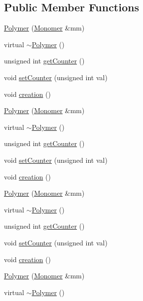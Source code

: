 \subsection*{Public Member Functions}
\begin{DoxyCompactItemize}
\item 
\hyperlink{class_polymer_ae77454a3908652e4df6a26b9cac509a5}{Polymer} (\hyperlink{class_monomer}{Monomer} \&mm)
\item 
virtual \hyperlink{class_polymer_aac2b3983f375a5691c7d5ca1a79594d5}{$\sim$\+Polymer} ()
\item 
unsigned int \hyperlink{class_polymer_a8346d821e5f8690d7816ba1d40036b69}{get\+Counter} ()
\item 
void \hyperlink{class_polymer_a7ed6bbe09a570b59f9253d63fd3326d2}{set\+Counter} (unsigned int val)
\item 
void \hyperlink{class_polymer_a1daba3eb2ba8428bf2f3e814668b155f}{creation} ()
\item 
\hyperlink{class_polymer_ae77454a3908652e4df6a26b9cac509a5}{Polymer} (\hyperlink{class_monomer}{Monomer} \&mm)
\item 
virtual \hyperlink{class_polymer_aac2b3983f375a5691c7d5ca1a79594d5}{$\sim$\+Polymer} ()
\item 
unsigned int \hyperlink{class_polymer_a8346d821e5f8690d7816ba1d40036b69}{get\+Counter} ()
\item 
void \hyperlink{class_polymer_a7ed6bbe09a570b59f9253d63fd3326d2}{set\+Counter} (unsigned int val)
\item 
void \hyperlink{class_polymer_a1daba3eb2ba8428bf2f3e814668b155f}{creation} ()
\item 
\hyperlink{class_polymer_ae77454a3908652e4df6a26b9cac509a5}{Polymer} (\hyperlink{class_monomer}{Monomer} \&mm)
\item 
virtual \hyperlink{class_polymer_aac2b3983f375a5691c7d5ca1a79594d5}{$\sim$\+Polymer} ()
\item 
unsigned int \hyperlink{class_polymer_a8346d821e5f8690d7816ba1d40036b69}{get\+Counter} ()
\item 
void \hyperlink{class_polymer_a7ed6bbe09a570b59f9253d63fd3326d2}{set\+Counter} (unsigned int val)
\item 
void \hyperlink{class_polymer_a1daba3eb2ba8428bf2f3e814668b155f}{creation} ()
\item 
\hyperlink{class_polymer_ae77454a3908652e4df6a26b9cac509a5}{Polymer} (\hyperlink{class_monomer}{Monomer} \&mm)
\item 
virtual \hyperlink{class_polymer_aac2b3983f375a5691c7d5ca1a79594d5}{$\sim$\+Polymer} ()

\end{DoxyCompactItemize}
